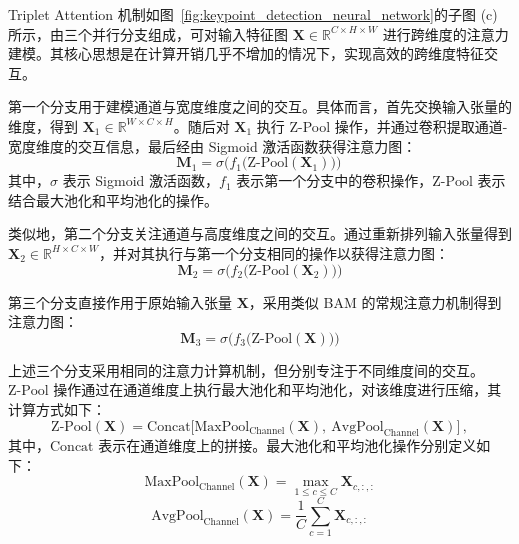 Triplet Attention 机制如图~\ref{fig:keypoint_detection_neural_network}的子图 (c) 所示，由三个并行分支组成，可对输入特征图 $\mathbf{X} \in \mathbb{R}^{C \times H \times W}$ 进行跨维度的注意力建模。其核心思想是在计算开销几乎不增加的情况下，实现高效的跨维度特征交互。

第一个分支用于建模通道与宽度维度之间的交互。具体而言，首先交换输入张量的维度，得到 $\mathbf{X}_{1} \in \mathbb{R}^{W \times C \times H}$。随后对 $\mathbf{X}_{1}$ 执行 Z-Pool 操作，并通过卷积提取通道-宽度维度的交互信息，最后经由 Sigmoid 激活函数获得注意力图：
\begin{equation} 
	\mathbf{M}_{1} = \sigma\!\Big(f_{1}\big(\text{Z-Pool}(\mathbf{X}_{1})\big)\Big)\,
\end{equation}
其中，$\sigma$ 表示 Sigmoid 激活函数，$f_{1}$ 表示第一个分支中的卷积操作，$\text{Z-Pool}$ 表示结合最大池化和平均池化的操作。

类似地，第二个分支关注通道与高度维度之间的交互。通过重新排列输入张量得到 $\mathbf{X}_{2} \in \mathbb{R}^{H \times C \times W}$，并对其执行与第一个分支相同的操作以获得注意力图：
\begin{equation} 
	\mathbf{M}_{2} = \sigma\!\Big(f_{2}\big(\text{Z-Pool}(\mathbf{X}_{2})\big)\Big)
\end{equation}

第三个分支直接作用于原始输入张量 $\mathbf{X}$，采用类似 BAM 的常规注意力机制得到注意力图：
\begin{equation} 
	\mathbf{M}_{3} = \sigma\!\Big(f_{3}\big(\text{Z-Pool}(\mathbf{X})\big)\Big)
\end{equation}

上述三个分支采用相同的注意力计算机制，但分别专注于不同维度间的交互。$\text{Z-Pool}$ 操作通过在通道维度上执行最大池化和平均池化，对该维度进行压缩，其计算方式如下：
\begin{equation} 
	\text{Z-Pool}(\mathbf{X}) = \text{Concat}\Big[\text{MaxPool}_{\text{Channel}}(\mathbf{X}),\ \text{AvgPool}_{\text{Channel}}(\mathbf{X})\Big]\,, 
\end{equation}
其中，$\text{Concat}$ 表示在通道维度上的拼接。最大池化和平均池化操作分别定义如下：
\begin{equation} 
	\text{MaxPool}_{\text{Channel}}(\mathbf{X}) = \max_{1 \le c \le C} \mathbf{X}_{c,:,:}
\end{equation}
\begin{equation} 
	\text{AvgPool}_{\text{Channel}}(\mathbf{X}) = \frac{1}{C} \sum_{c=1}^{C} \mathbf{X}_{c,:,:}
\end{equation}

